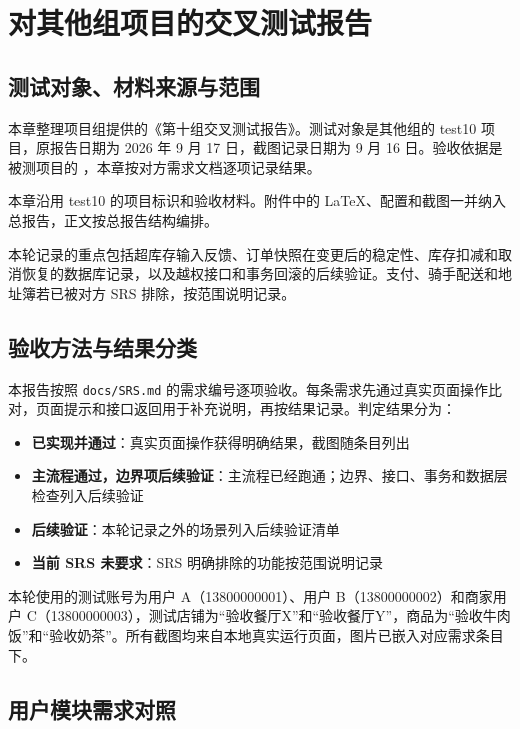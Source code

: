 \chapter{对其他组项目的交叉测试报告}
\section{测试对象、材料来源与范围}
本章整理项目组提供的《第十组交叉测试报告》。测试对象是其他组的 test10 项目，原报告日期为 2026 年 9 月 17 日，截图记录日期为 9 月 16 日。验收依据是被测项目的 ，本章按对方需求文档逐项记录结果。

本章沿用 test10 的项目标识和验收材料。附件中的 LaTeX、配置和截图一并纳入总报告，正文按总报告结构编排。

本轮记录的重点包括超库存输入反馈、订单快照在变更后的稳定性、库存扣减和取消恢复的数据库记录，以及越权接口和事务回滚的后续验证。支付、骑手配送和地址簿若已被对方 SRS 排除，按范围说明记录。
\section{验收方法与结果分类}\label{1-ux9a8cux6536ux65b9ux6cd5ux4e0eux5224ux5b9aux53e3ux5f84}

本报告按照 \texttt{docs/SRS.md} 的需求编号逐项验收。每条需求先通过真实页面操作比对，页面提示和接口返回用于补充说明，再按结果记录。判定结果分为：

\begin{itemize}
\tightlist
\item
  \textbf{已实现并通过}：真实页面操作获得明确结果，截图随条目列出
\item
  \textbf{主流程通过，边界项后续验证}：主流程已经跑通；边界、接口、事务和数据层检查列入后续验证
\item
  \textbf{后续验证}：本轮记录之外的场景列入后续验证清单
\item
  \textbf{当前 SRS 未要求}：SRS 明确排除的功能按范围说明记录
\end{itemize}

本轮使用的测试账号为用户 A（13800000001）、用户
B（13800000002）和商家用户
C（13800000003），测试店铺为``验收餐厅X''和``验收餐厅Y''，商品为``验收牛肉饭''和``验收奶茶''。所有截图均来自本地真实运行页面，图片已嵌入对应需求条目下。

\section{用户模块需求对照}\label{2-ux7528ux6237ux6a21ux5757ux9700ux6c42ux5bf9ux7167}

